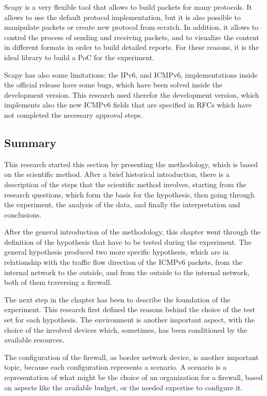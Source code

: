 \documentclass[12pt]{article}
\begin{document}
Scapy is a very flexible tool that allows to build packets for many protocols. It allows to use the default protocol implementation, but it is also possible to manipulate packets or create new protocol from scratch. In addition, it allows to control the process of sending and receiving packets, and to visualize the content in different formats in order to build detailed reports. For these reasons, it is the ideal library to build a PoC for the experiment.

Scapy has also some limitations: the IPv6, and ICMPv6, implementations inside the official release have some bugs, which have been solved inside the development version. This research used therefor the development version, which implements also the new ICMPv6 fields that are specified in RFCs which have not completed the necessary approval steps\cite{rfc4884,rfc3775,rfc4191,rfc4389}.

\subsection{Summary}
\label{sub:methConclusions}

This research started this section by presenting the methodology, which is based on the scientific method. After a brief historical introduction, there is a description of the steps that the scientific method involves, starting from the research questions, which form the basis for the hypothesis, then going through the experiment, the analysis of the data, and finally the interpretation and conclusions.

After the general introduction of the methodology, this chapter went through the definition of the hypothesis that have to be tested during the experiment. The general hypothesis produced two more specific hypothesis, which are in relationship with the traffic flow direction of the ICMPv6 packets, from the internal network to the outside, and from the outside to the internal network, both of them traversing a firewall.

The next step in the chapter has been to describe the foundation of the experiment. This research first defined the reasons behind the choice of the test set for each hypothesis. The environment is another important aspect, with the choice of the involved devices which, sometimes, has been conditioned by the available resources.

The configuration of the firewall, as border network device, is another important topic, because each configuration represents a scenario. A scenario is a representation of what might be the choice of an organization for a firewall, based on aspects like the available budget, or the needed expertise to configure it.
\end{document}
